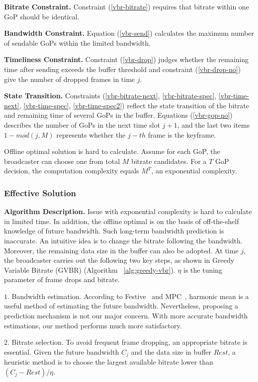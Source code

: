 \textbf{Bitrate Constraint.} Constraint (\ref{vbr-bitrate}) requires that bitrate within one GoP should be identical.

\textbf{Bandwidth Constraint.} Equation (\ref{vbr-send}) calculates the maximum number of sendable GoPs within the limited bandwidth.

\textbf{Timeliness Constraint.} Constraint (\ref{vbr-drop}) judges whether the remaining time after sending exceeds the buffer threshold and constraint (\ref{vbr-drop-no}) give the number of dropped frames in time $j$.

\textbf{State Transition.} Constraints (\ref{vbr-bitrate-next}, \ref{vbr-bitrate-spec}, \ref{vbr-time-next}, \ref{vbr-time-spec}, \ref{vbr-time-spec2}) reflect the state transition of the bitrate and remaining time of several GoPs in the buffer. Equations (\ref{vbr-gop-no}) describes the number of GoPs in the next time slot $j+1$, and the last two items $1-mod(j,M)$ represents whether the $j-th$ frame is the keyframe.

Offline optimal solution is hard to calculate. Assume for each GoP, the broadcaster can choose one from total $M$ bitrate candidates. For a $T$ GoP decision, the computation complexity equals $M^T$, an exponential complexity.

\subsubsection{Effective Solution} 

\textbf{Algorithm Description.} Issue with exponential complexity is hard to calculate in limited time. In addition, the offline optimal is on the basis of off-the-shelf knowledge of future bandwidth. Such long-term bandwidth prediction is inaccurate. An intuitive idea is to change the bitrate following the bandwidth. Moreover, the remaining data size in the buffer can also be adopted. At time $j$, the broadcaster carries out the following two key steps, as shown in Greedy Variable Bitrate (GVBR) (Algorithm ~\ref{alg:greedy-vbr}). $\eta$ is the tuning parameter of frame drops and bitrate.

$1.$ Bandwidth estimation. According to Festive~\cite{jiang2014improving} and MPC~\cite{yin2015control}, harmonic mean is a useful method of estimating the future bandwidth. Nevertheless, proposing a prediction mechanism is not our major concern. With more accurate bandwidth estimations, our method performs much more satisfactory.

$2.$ Bitrate selection. To avoid frequent frame dropping, an appropriate bitrate is essential. Given the future bandwidth $C_j$ and the data size in buffer $Rest$, a heuristic method is to choose the largest available bitrate lower than $(C_j-Rest)/\eta$.
